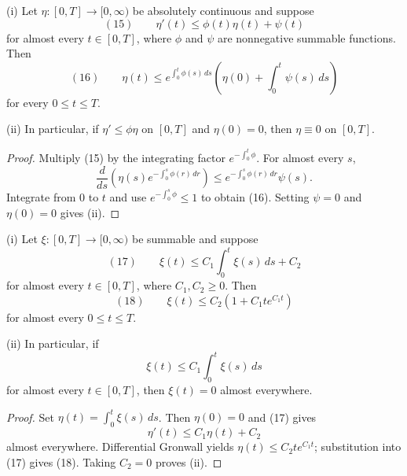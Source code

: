 \begin{lemma}
\label{lem:gronwalls-inequality-differential-form}
(i) Let $\eta:[0,T]\to[0,\infty)$ be absolutely continuous and suppose
\[
(15)\qquad
\eta'(t)\leq\phi(t)\eta(t)+\psi(t)
\]
for almost every $t\in[0,T]$, where $\phi$ and $\psi$ are nonnegative summable functions. Then
\[
(16)\qquad
\eta(t)
\leq e^{\int_0^t\phi(s)\,ds}
\left(\eta(0)+\int_0^t\psi(s)\,ds\right)
\]
for every $0\leq t\leq T$.

(ii) In particular, if $\eta'\leq\phi\eta$ on $[0,T]$ and $\eta(0)=0$, then $\eta\equiv0$ on $[0,T]$.
\end{lemma}
\begin{proof}
\sketch Multiply (15) by the integrating factor $e^{-\int_0^t\phi}$. For almost every $s$,
\[
\frac d{ds}\left(\eta(s)e^{-\int_0^s\phi(r)\,dr}\right)
\leq e^{-\int_0^s\phi(r)\,dr}\psi(s).
\]
Integrate from $0$ to $t$ and use $e^{-\int_0^s\phi}\leq1$ to obtain (16). Setting $\psi=0$ and $\eta(0)=0$ gives (ii).
\end{proof}

\begin{lemma}
\label{lem:gronwalls-inequality-integral-form}
(i) Let $\xi:[0,T]\to[0,\infty)$ be summable and suppose
\[
(17)\qquad
\xi(t)\leq C_1\int_0^t\xi(s)\,ds+C_2
\]
for almost every $t\in[0,T]$, where $C_1,C_2\geq0$. Then
\[
(18)\qquad
\xi(t)\leq C_2(1+C_1te^{C_1t})
\]
for almost every $0\leq t\leq T$.

(ii) In particular, if
\[
\xi(t)\leq C_1\int_0^t\xi(s)\,ds
\]
for almost every $t\in[0,T]$, then $\xi(t)=0$ almost everywhere.
\end{lemma}
\begin{proof}
\sketch Set $\eta(t)=\int_0^t\xi(s)\,ds$. Then $\eta(0)=0$ and (17) gives
\[
\eta'(t)\leq C_1\eta(t)+C_2
\]
almost everywhere. Differential Gronwall yields $\eta(t)\leq C_2te^{C_1t}$; substitution into (17) gives (18). Taking $C_2=0$ proves (ii).
\end{proof}
